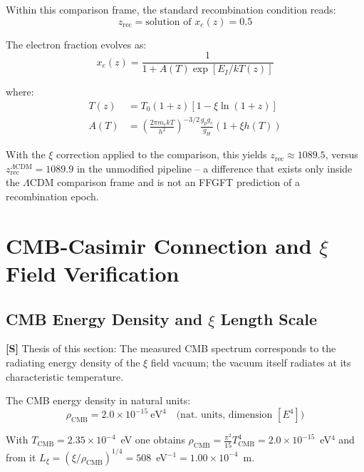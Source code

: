 	Within this comparison frame, the standard recombination condition reads:
	\begin{equation}
		z_{\text{rec}} = \text{solution of } x_e(z) = 0.5
	\end{equation}

	The electron fraction evolves as:
	\begin{equation}
		x_e(z) = \frac{1}{1 + A(T) \exp[E_I/kT(z)]}
	\end{equation}

	where:
	\begin{align}
		T(z) &= T_0(1+z)[1 - \xi\ln(1+z)] \\
		A(T) &= \left(\frac{2\pi m_e kT}{h^2}\right)^{-3/2} 
		\frac{g_p g_e}{g_H} (1 + \xi h(T))
	\end{align}

	With the $\xi$ correction applied to the comparison, this yields
	$z_{\text{rec}} \approx 1089.5$, versus
	$z_{\text{rec}}^{\Lambda\text{CDM}} = 1089.9$ in the unmodified pipeline --
	a difference that exists only inside the $\Lambda$CDM comparison frame and is
	not an FFGFT prediction of a recombination epoch.

	
	\section{CMB-Casimir Connection and $\xi$ Field Verification}
	\label{sec:cmb_casimir}
	
	\subsection{CMB Energy Density and $\xi$ Length Scale}
	
	\begin{important}[Thesis]
		\textbf{[S]} Thesis of this section: The measured CMB spectrum corresponds to the radiating energy density of the $\xi$ field vacuum; the vacuum itself radiates at its characteristic temperature.
	\end{important}
	
	The CMB energy density in natural units:
	\begin{equation}
		\rho_{\text{CMB}} = 2.0 \times 10^{-15}\ \text{eV}^4 \quad \text{(nat. units, dimension } [E^4] \text{)}
	\end{equation}
	
	With $T_{\text{CMB}} = 2.35 \times 10^{-4}$~eV one obtains $\rho_{\text{CMB}} = \frac{\pi^2}{15} T_{\text{CMB}}^4 = 2.0 \times 10^{-15}$~eV$^4$ and from it $L_\xi = (\xi/\rho_{\text{CMB}})^{1/4} = 508$~eV$^{-1} = 1.00 \times 10^{-4}$~m.
	
